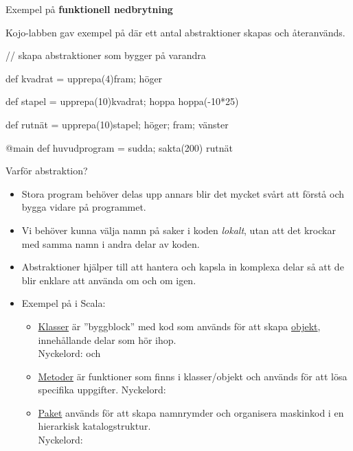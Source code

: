 \begin{Slide}{Exempel på \textbf{funktionell nedbrytning}}

Kojo-labben gav exempel på  där ett antal abstraktioner skapas och återanvänds.

\begin{Code}
// skapa abstraktioner som bygger på varandra

def kvadrat = upprepa(4){fram; höger}

def stapel = 
  upprepa(10){kvadrat; hoppa}
  hoppa(-10*25)

def rutnät = upprepa(10){stapel; höger; fram; vänster}

@main def huvudprogram =
  sudda; sakta(200)
  rutnät
\end{Code}
\end{Slide}


\begin{Slide}{Varför abstraktion?}
\begin{itemize}
\item Stora program behöver delas upp annars blir det mycket svårt att förstå och bygga vidare på programmet.
\item Vi behöver kunna välja namn på saker i koden \textit{lokalt}, utan att det krockar med samma namn i andra delar av koden.
\item Abstraktioner hjälper till att hantera och kapsla in komplexa delar så att de blir enklare att använda om och om igen.

\item Exempel på  i Scala:
\begin{itemize}

\item \href{https://sv.wikipedia.org/wiki/Klass_\%28programmering\%29}{Klasser} är ''byggblock'' med kod som används för att skapa \href{https://sv.wikipedia.org/wiki/Objektorienterad_programmering\#Objekt}{objekt}, innehållande delar som hör ihop. \\ Nyckelord:  och 

\item \href{https://en.wikipedia.org/wiki/Method_\%28computer_programming\%29}{Metoder} är funktioner som finns i klasser/objekt och används för att lösa specifika uppgifter.  Nyckelord: 

\item \href{https://en.wikipedia.org/wiki/Java_package}{Paket} används för att skapa namnrymder och organisera maskinkod i en hierarkisk katalogstruktur. \\Nyckelord: 

\end{itemize}

\end{itemize}
\end{Slide}


